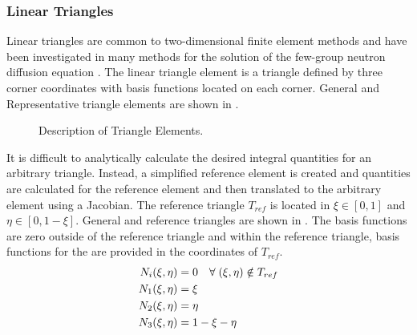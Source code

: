     \subsubsection{Linear Triangles}
      Linear triangles are common to two-dimensional finite element methods and
      have been investigated in many methods for the solution of the few-group
      neutron diffusion equation
      \cite{Hosseini2017,Hosseini2013,Hosseini2015}. The linear triangle element 
      is a triangle defined by three corner coordinates with basis functions 
      located on each corner. General and Representative triangle elements are
      shown in .

      \begin{figure}
        \centering
        \vspace{0.2in}
        \caption{Description of Triangle Elements.}
        \label{fig:triangle_elements}
      \end{figure}

      It is difficult to analytically calculate the desired integral quantities
      for an arbitrary triangle. Instead, a simplified reference element is
      created and quantities are calculated for the reference element and then
      translated to the arbitrary element using a Jacobian. 
      The reference triangle $T_{ref}$ is located in
      $\xi \in [0,1]$ and $\eta \in [0,1-\xi]$. General and reference triangles
      are shown in . The
      basis functions are zero outside of the reference triangle and within the
      reference triangle, basis functions for the are provided in the
      coordinates of $T_{ref}$.
      \begin{align}
        N_i(\xi,\eta) &= 0 \quad \forall \; (\xi,\eta) \notin T_{ref} \\
        N_1(\xi,\eta) &= \xi \\
        N_2(\xi,\eta) &= \eta \\
        N_3(\xi,\eta) &= 1-\xi-\eta
      \end{align}
      
